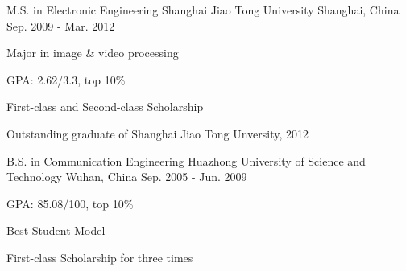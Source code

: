 

\begin{cventries}

  \cventry
    {M.S. in Electronic Engineering} %
    {Shanghai Jiao Tong University} %
    {Shanghai, China} %
    {Sep. 2009 - Mar. 2012} %
    {
      \begin{cvitems} %
	    \item {Major in image \& video processing}
        \item {GPA: 2.62/3.3, top 10\%}
		\item {First-class and Second-class Scholarship}
        \item {Outstanding graduate of Shanghai Jiao Tong Unversity, 2012}
      \end{cvitems}
    }

  \cventry
    {B.S. in Communication Engineering} %
    {Huazhong University of Science and Technology} %
    {Wuhan, China} %
    {Sep. 2005 - Jun. 2009} %
    {
      \begin{cvitems} %
        \item {GPA: 85.08/100, top 10\%}
		\item {Best Student Model}
		\item {First-class Scholarship for three times}
      \end{cvitems}
    }

\end{cventries}
